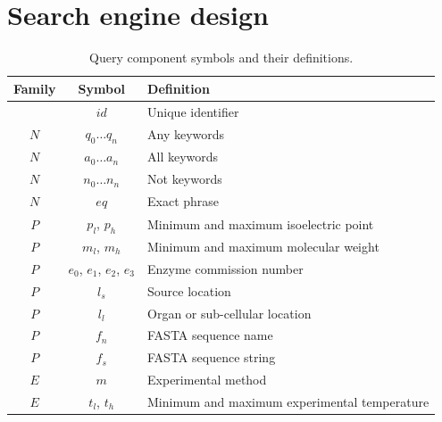 

\section{Search engine design}\label{sec:search-engine}

\begin{table}[H]
\centering
\begin{tabular}{| c | c | l |}
\hline
\textbf{Family} & \textbf{Symbol} & \textbf{Definition}\\
\hline
& $id$ & Unique identifier\\
$N$ & $q_0 \ldots q_n$ & Any keywords\\
$N$ & $a_0 \ldots a_n$ & All keywords\\
$N$ & $n_0 \ldots n_n$ & Not keywords\\
$N$ & $eq$ & Exact phrase\\
$P$ & $p_l$, $p_h$ & Minimum and maximum isoelectric point\\
$P$ & $m_l$, $m_h$ & Minimum and maximum molecular weight\\
$P$ & $e_0$, $e_1$, $e_2$, $e_3$ & Enzyme commission number\\
$P$ & $l_s$ & Source location\\
$P$ & $l_l$ & Organ or sub-cellular location\\
$P$ & $f_n$ & FASTA sequence name\\
$P$ & $f_s$ & FASTA sequence string\\
$E$ & $m$ & Experimental method\\
$E$ & $t_l$, $t_h$ & Minimum and maximum experimental temperature\\
\hline
\end{tabular}
\caption[Query component symbols and their definitions]{Query component symbols and their definitions.}
\label{tab:query-components}
\end{table}



\newpage

